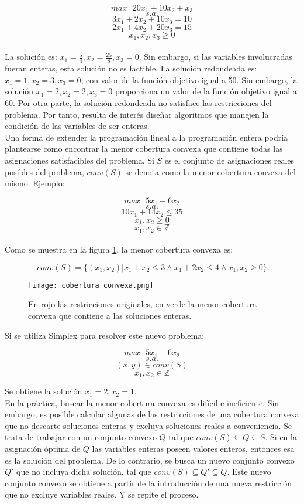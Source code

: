 \documentclass[12pt]{report}
\begin{document}
$$max \text{ } 20x_1+10x_2+x_3$$
$$s.a.$$
$$3x_1+2x_2+10x_3=10$$
$$2x_1+4x_2+20x_3=15$$
$$x_1,x_2,x_3\geq 0$$\\

La solución es: $x_1 = \frac54,x_2 = \frac{25}{8},x_3 = 0$. Sin embargo, si las variables involucradas fueran enteras, esta solución no es factible. La solución redondeada es: $x_1 = 1,x_2 = 3,x_3 = 0$, con valor de la función objetivo igual a 50. Sin embargo, la solución $x_1 = 2,x_2 = 2,x_3 = 0$ proporciona un valor de la función objetivo igual a 60. Por otra parte, la solución redondeada no satisface las restricciones del problema. Por tanto, resulta de interés diseñar algoritmos que manejen la condición de las variables de ser enteras.\\

Una forma de extender la programación lineal a la programación entera podría plantearse como encontrar la menor cobertura convexa que contiene todas las asignaciones satisfacibles del problema. Si $S$ es el conjunto de asignaciones reales posibles del problema, $conv(S)$ se denota como la menor cobertura convexa del mismo. Ejemplo:

$$max \text{ } 5x_1+6x_2$$
$$s.a.$$
$$10x_1+14x_2 \leq  35$$
$$x_1,x_2\geq 0$$
$$x_1,x_2\in\mathbb{Z}$$\\

Como se muestra en la figura \ref{fig:cobertura convexa}, la menor cobertura convexa es:

$$conv(S)=\{(x_1,x_2)|x_1+x_2\leq 3 \land x_1+2x_2\leq 4 \land x_1,x_2\geq 0\}$$

\begin{figure}[ht]
    \centering
    \texttt{[image: cobertura convexa.png]}
    \caption{En rojo las restricciones originales, en verde la menor cobertura convexa que contiene a las soluciones enteras.}
    \label{fig:cobertura convexa}
\end{figure}

Si se utiliza Simplex para resolver este nuevo problema:

$$max \text{ } 5x_1+6x_2$$
$$s.a.$$
$$(x,y) \in conv(S)$$
$$x_1,x_2\in\mathbb{Z}$$

Se obtiene la solución $x_1=2, x_2=1$.\\

En la práctica, buscar la menor cobertura convexa es difícil e ineficiente. Sin embargo, es posible calcular algunas de las restricciones de una cobertura convexa que no descarte soluciones enteras y excluya soluciones reales a conveniencia. Se trata de trabajar con un conjunto convexo $Q$ tal que $conv(S)\subseteq Q\subseteq S$. Si en la asignación óptima de $Q$ las variables enteras poseen valores enteros, entonces esa es la solución del problema. De lo contrario, se busca un nuevo conjunto convexo $Q'$ que no incluya dicha solución, tal que $conv(S)\subseteq Q'\subseteq Q$. Este nuevo conjunto convexo se obtiene a partir de la introducción de una nueva restricción que no excluye variables reales. Y se repite el proceso.\\
\end{document}
